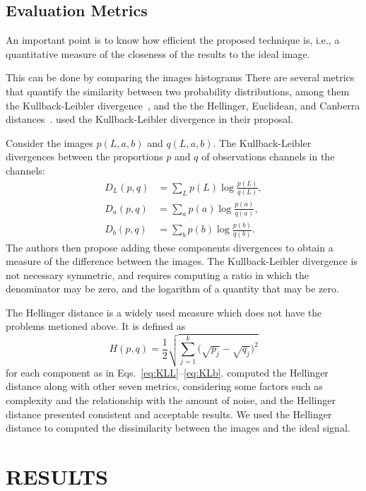 \documentclass{article}
\begin{document}
\subsection{Evaluation Metrics}

An important point is to know how efficient the proposed technique is, i.e., a quantitative measure of the closeness of the results to the ideal image. 

This can be done by comparing the images histograms
There are several metrics that quantify the similarity between two probability distributions, among them the Kullback-Leibler divergence~\citep{AssessingInformationContentinColorImages}, and the
the Hellinger, 
Euclidean, and Canberra distances~\citep{BanchmarckSimiliraty}.
\citet{AssessingInformationContentinColorImages} used the Kullback-Leibler divergence in their proposal.

Consider the images $p(L, a, b)$ and $q(L, a, b)$.
The Kullback-Leibler divergences between the proportions $p$ and $q$ of observations channels in the channels:
\begin{align}
D_{L}(p,q) & = \sum_{L} p(L) \log\frac{p(L)}{q(L)},\label{eq:KLL}\\
D_{a}(p,q) & = \sum_{a} p(a) \log\frac{p(a)}{q(a)},\label{eq:KLa}\\
D_{b}(p,q) & = \sum_{b} p(b) \log\frac{p(b)}{q(b)}\label{eq:KLb}.
\end{align}
The authors then propose adding these components divergences to obtain a measure of the difference between the images.
The Kullback-Leibler divergence is not necessary symmetric, and requires computing a ratio in which the denominator may be zero, and the logarithm of a quantity that may be zero.

The Hellinger distance is a widely used measure which does not have the problems metioned above.
It is defined as
\begin{equation}
	H(p, q) = \frac{1}{2}\sqrt{\sum_{j=1}^k \big(\sqrt{p_j} - \sqrt{q_j}\big)^2}
	\label{Eq:Hellinger}
\end{equation}
for each component as in Eqs.~\eqref{eq:KLL}--\eqref{eq:KLb}.
\citet{BanchmarckSimiliraty} computed the Hellinger distance along with other seven metrics, considering some factors such as complexity and the relationship with the amount of noise, and the Hellinger distance presented consistent and acceptable results.
We used the Hellinger distance to computed the dissimilarity between the images and the ideal signal.

\section{RESULTS}
\label{Sec:Results}
\end{document}
